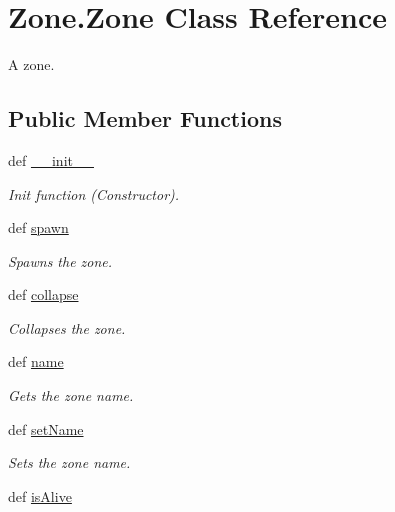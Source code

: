 \hypertarget{class_zone_1_1_zone}{
\section{Zone.Zone Class Reference}
\label{class_zone_1_1_zone}
}


A zone.  


\subsection*{Public Member Functions}
\begin{DoxyCompactItemize}
\item 
def \hyperlink{class_zone_1_1_zone_afe0e971765baa04ca770cbdc685efbb6}{\_\-\_\-init\_\-\_\-}
\begin{DoxyCompactList}\small\item\em Init function (Constructor). \item\end{DoxyCompactList}\item 
def \hyperlink{class_zone_1_1_zone_a6197bd3a82e33df84c7a24a2bd698516}{spawn}
\begin{DoxyCompactList}\small\item\em Spawns the zone. \item\end{DoxyCompactList}\item 
def \hyperlink{class_zone_1_1_zone_a82cd5417c0fd6dc0cb7d1b8a3399e174}{collapse}
\begin{DoxyCompactList}\small\item\em Collapses the zone. \item\end{DoxyCompactList}\item 
def \hyperlink{class_zone_1_1_zone_acbb02f4e05a741d0f0817f3f7a72b215}{name}
\begin{DoxyCompactList}\small\item\em Gets the zone name. \item\end{DoxyCompactList}\item 
def \hyperlink{class_zone_1_1_zone_a01a15c4548a4e2675890cec3b6172beb}{setName}
\begin{DoxyCompactList}\small\item\em Sets the zone name. \item\end{DoxyCompactList}\item 
def \hyperlink{class_zone_1_1_zone_af99fbbc555e6f93d62126c17ae9a8052}{isAlive}

\end{DoxyCompactItemize}
